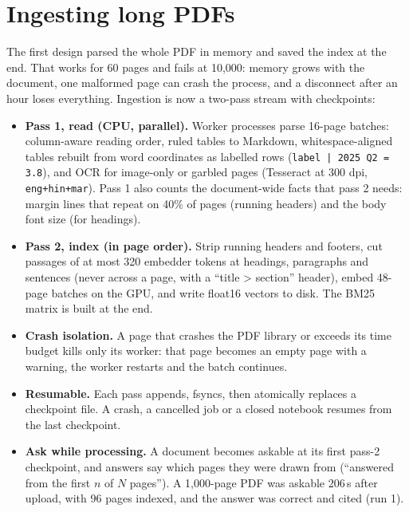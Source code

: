 \documentclass[10pt,a4paper]{article}
\begin{document}
\section{Ingesting long PDFs}
The first design parsed the whole PDF in memory and saved the index at the end. That works for 60 pages and fails at 10,000:
memory grows with the document, one malformed page can crash the process, and a disconnect after an hour loses everything.
Ingestion is now a two-pass stream with checkpoints:
\begin{itemize}
  \item \textbf{Pass 1, read (CPU, parallel).} Worker processes parse 16-page batches: column-aware reading order, ruled tables to Markdown, whitespace-aligned tables
        rebuilt from word coordinates as labelled rows (\texttt{label | 2025 Q2 = 3.8}), and OCR for image-only or garbled pages (Tesseract at 300 dpi, \texttt{eng+hin+mar}).
        Pass 1 also counts the document-wide facts that pass 2 needs: margin lines that repeat on 40\% of pages (running headers) and the body font size (for headings).
  \item \textbf{Pass 2, index (in page order).} Strip running headers and footers, cut passages of at most 320 embedder tokens at headings, paragraphs and sentences
        (never across a page, with a ``title \textgreater{} section'' header), embed 48-page batches on the GPU, and write float16 vectors to disk. The BM25 matrix is built at the end.
  \item \textbf{Crash isolation.} A page that crashes the PDF library or exceeds its time budget kills only its worker: that page becomes an empty page with a warning,
        the worker restarts and the batch continues.
  \item \textbf{Resumable.} Each pass appends, fsyncs, then atomically replaces a checkpoint file. A crash, a cancelled job or a closed notebook resumes from the last checkpoint.
  \item \textbf{Ask while processing.} A document becomes askable at its first pass-2 checkpoint, and answers say which pages they were drawn from
        (``answered from the first $n$ of $N$ pages''). A 1,000-page PDF was askable 206\,s after upload, with 96 pages indexed, and the answer was correct and cited (run 1).
\end{itemize}

\end{document}
